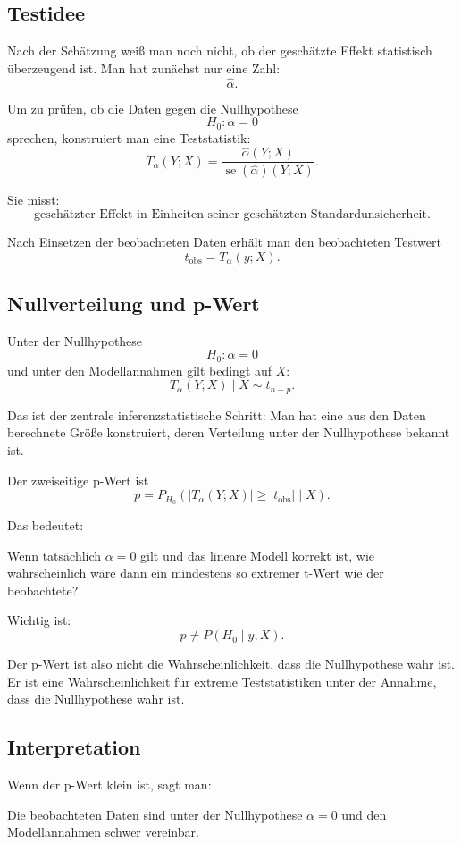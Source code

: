\documentclass[10pt, letterpaper]{article}
\begin{document}
\subsection{Testidee}

Nach der Schätzung weiß man noch nicht, ob der geschätzte Effekt statistisch überzeugend ist. Man hat zunächst nur eine Zahl:
\[
\widehat\alpha.
\]

Um zu prüfen, ob die Daten gegen die Nullhypothese
\[
H_0:\alpha=0
\]
sprechen, konstruiert man eine Teststatistik:
\[
T_\alpha(Y;X)
=
\frac{\widehat\alpha(Y;X)}
{\operatorname{se}(\widehat\alpha)(Y;X)}.
\]

Sie misst:
\[
\text{geschätzter Effekt in Einheiten seiner geschätzten Standardunsicherheit}.
\]

Nach Einsetzen der beobachteten Daten erhält man den beobachteten Testwert
\[
t_{\mathrm{obs}}
=
T_\alpha(y;X).
\]

\subsection{Nullverteilung und p-Wert}

Unter der Nullhypothese
\[
H_0:\alpha=0
\]
und unter den Modellannahmen gilt bedingt auf \(X\):
\[
T_\alpha(Y;X)\mid X
\sim
t_{n-p}.
\]

Das ist der zentrale inferenzstatistische Schritt: Man hat eine aus den Daten berechnete Größe konstruiert, deren Verteilung unter der Nullhypothese bekannt ist.

Der zweiseitige p-Wert ist
\[
p=
P_{H_0}\left(
|T_\alpha(Y;X)|\geq |t_{\mathrm{obs}}|
\mid X
\right).
\]

Das bedeutet:

Wenn tatsächlich $\alpha=0$ gilt und das lineare Modell korrekt ist, wie wahrscheinlich wäre dann ein mindestens so extremer t-Wert wie der beobachtete?


Wichtig ist:
\[
p\neq P(H_0\mid y,X).
\]

Der p-Wert ist also nicht die Wahrscheinlichkeit, dass die Nullhypothese wahr ist. Er ist eine Wahrscheinlichkeit für extreme Teststatistiken unter der Annahme, dass die Nullhypothese wahr ist.

\subsection{Interpretation}

Wenn der p-Wert klein ist, sagt man:

Die beobachteten Daten sind unter der Nullhypothese $\alpha=0$ und den Modellannahmen schwer vereinbar.
\end{document}
